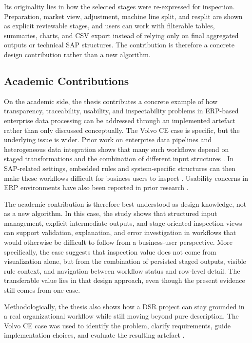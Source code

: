 Its originality lies in how the selected stages were re-expressed for inspection. Preparation, market view, adjustment, machine line split, and resplit are shown as explicit reviewable stages, and users can work with filterable tables, summaries, charts, and CSV export instead of relying only on final aggregated outputs or technical SAP structures. The contribution is therefore a concrete design contribution rather than a new algorithm.

\subsection{Academic Contributions}
On the academic side, the thesis contributes a concrete example of how transparency, traceability, usability, and inspectability problems in ERP-based enterprise data processing can be addressed through an implemented artefact rather than only discussed conceptually. The Volvo CE case is specific, but the underlying issue is wider. Prior work on enterprise data pipelines and heterogeneous data integration shows that many such workflows depend on staged transformations and the combination of different input structures \cite{vassiliadis2009etl,putrama2024heterogeneous}. In SAP-related settings, embedded rules and system-specific structures can then make these workflows difficult for business users to inspect \cite{weber2022sap}. Usability concerns in ERP environments have also been reported in prior research \cite{calisir2004erp}.

The academic contribution is therefore best understood as design knowledge, not as a new algorithm. In this case, the study shows that structured input management, explicit intermediate outputs, and stage-oriented inspection views can support validation, explanation, and error investigation in workflows that would otherwise be difficult to follow from a business-user perspective. More specifically, the case suggests that inspection value does not come from visualization alone, but from the combination of persisted staged outputs, visible rule context, and navigation between workflow status and row-level detail. The transferable value lies in that design approach, even though the present evidence still comes from one case.

Methodologically, the thesis also shows how a DSR project can stay grounded in a real organizational workflow while still moving beyond pure description. The Volvo CE case was used to identify the problem, clarify requirements, guide implementation choices, and evaluate the resulting artefact \cite{johannesson2021}.
